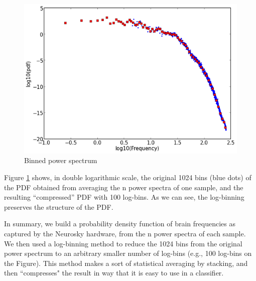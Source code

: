 \begin{figure}
\begin{center}
\includegraphics[width=5in]{Figures/binned_EEGPowerSpectrum.png}
\caption{Binned power spectrum}
\label{binnedEEGpowerspec}
\end{center}
\end{figure}


Figure \ref{binnedEEGpowerspec} shows, in double logarithmic scale, the original 1024 bins (blue dots) of the PDF obtained from averaging the n power spectra of one sample, and the resulting ``compressed''  PDF with 100 log-bins. As we can see, the log-binning preserves the structure of the PDF.

In summary, we build a probability density function of brain frequencies as captured by the Neurosky hardware, from the n power spectra of each sample. We then used a log-binning method to reduce the 1024 bins from the original power spectrum to an arbitrary smaller number of log-bins (e.g., 100 log-bins on the Figure). This method makes a sort of statistical averaging by stacking, and then ``compresses" the result in way that it is easy to use in a classifier.


